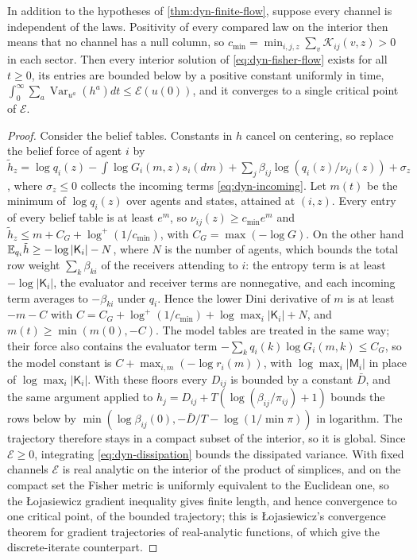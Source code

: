 In addition to the hypotheses of \cref{thm:dyn-finite-flow}, suppose every channel is independent of the laws. Positivity of every compared law on the interior then means that no channel has a null column, so $c_{\min}=\min_{i,j,z}\sum_v\mathcal K_{ij}(v,z)>0$ in each sector. Then every interior solution of \cref{eq:dyn-fisher-flow} exists for all $t\geq0$, its entries are bounded below by a positive constant uniformly in time, $\int_0^\infty\sum_a\operatorname{Var}_{u^a}(h^a)dt\leq\mathcal E(u(0))$, and it converges to a single critical point of $\mathcal E$.
\begin{proof}
Consider the belief tables. Constants in $h$ cancel on centering, so replace the belief force of agent $i$ by $\tilde h_z=\log q_i(z)-\int\log G_i(m,z)s_i(dm)+\sum_j\beta_{ij}\log(q_i(z)/\nu_{ij}(z))+\sigma_z$, where $\sigma_z\leq0$ collects the incoming terms \cref{eq:dyn-incoming}. Let $m(t)$ be the minimum of $\log q_i(z)$ over agents and states, attained at $(i,z)$. Every entry of every belief table is at least $e^m$, so $\nu_{ij}(z)\geq c_{\min}e^m$ and $\tilde h_z\leq m+C_G+\log^+(1/c_{\min})$, with $C_G=\max(-\log G)$. On the other hand $\mathbb E_{q_i}\tilde h\geq-\log|\mathsf K_i|-N$, where $N$ is the number of agents, which bounds the total row weight $\sum_k\beta_{ki}$ of the receivers attending to $i$: the entropy term is at least $-\log|\mathsf K_i|$, the evaluator and receiver terms are nonnegative, and each incoming term averages to $-\beta_{ki}$ under $q_i$. Hence the lower Dini derivative of $m$ is at least $-m-C$ with $C=C_G+\log^+(1/c_{\min})+\log\max_i|\mathsf K_i|+N$, and $m(t)\geq\min(m(0),-C)$. The model tables are treated in the same way; their force also contains the evaluator term $-\sum_kq_i(k)\log G_i(m,k)\leq C_G$, so the model constant is $C+\max_{i,m}(-\log r_i(m))$, with $\log\max_i|\mathsf M_i|$ in place of $\log\max_i|\mathsf K_i|$. With these floors every $D_{ij}$ is bounded by a constant $\bar D$, and the same argument applied to $h_j=D_{ij}+T(\log(\beta_{ij}/\pi_{ij})+1)$ bounds the rows below by $\min(\log\beta_{ij}(0),-\bar D/T-\log(1/\min\pi))$ in logarithm. The trajectory therefore stays in a compact subset of the interior, so it is global. Since $\mathcal E\geq0$, integrating \cref{eq:dyn-dissipation} bounds the dissipated variance. With fixed channels $\mathcal E$ is real analytic on the interior of the product of simplices, and on the compact set the Fisher metric is uniformly equivalent to the Euclidean one, so the {\L}ojasiewicz gradient inequality \citep{Lojasiewicz1963} gives finite length, and hence convergence to one critical point, of the bounded trajectory; this is {\L}ojasiewicz's convergence theorem for gradient trajectories of real-analytic functions, of which \citet{AbsilMahonyAndrews2005} give the discrete-iterate counterpart.
\end{proof}

